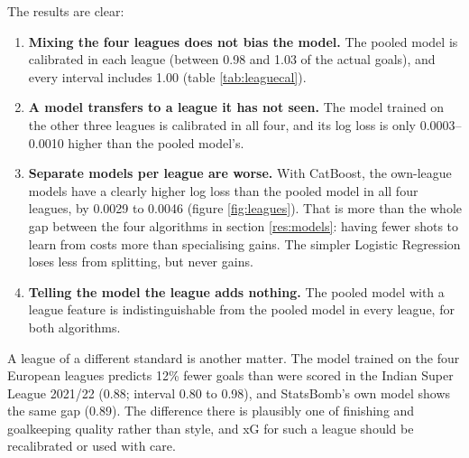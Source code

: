The results are clear:
\begin{enumerate}
    \item \textbf{Mixing the four leagues does not bias the model.} The pooled model is calibrated in each league (between 0.98 and 1.03 of the actual goals), and every interval includes 1.00 (table \ref{tab:leaguecal}).
    \item \textbf{A model transfers to a league it has not seen.} The model trained on the other three leagues is calibrated in all four, and its log loss is only 0.0003--0.0010 higher than the pooled model's.
    \item \textbf{Separate models per league are worse.} With CatBoost, the own-league models have a clearly higher log loss than the pooled model in all four leagues, by 0.0029 to 0.0046 (figure \ref{fig:leagues}). That is more than the whole gap between the four algorithms in section \ref{res:models}: having fewer shots to learn from costs more than specialising gains. The simpler Logistic Regression loses less from splitting, but never gains.
    \item \textbf{Telling the model the league adds nothing.} The pooled model with a league feature is indistinguishable from the pooled model in every league, for both algorithms.
\end{enumerate}

A league of a different standard is another matter. The model trained on the four European leagues predicts 12\% fewer goals than were scored in the Indian Super League 2021/22 (0.88; interval 0.80 to 0.98), and StatsBomb's own model shows the same gap (0.89). The difference there is plausibly one of finishing and goalkeeping quality rather than style, and xG for such a league should be recalibrated or used with care.
